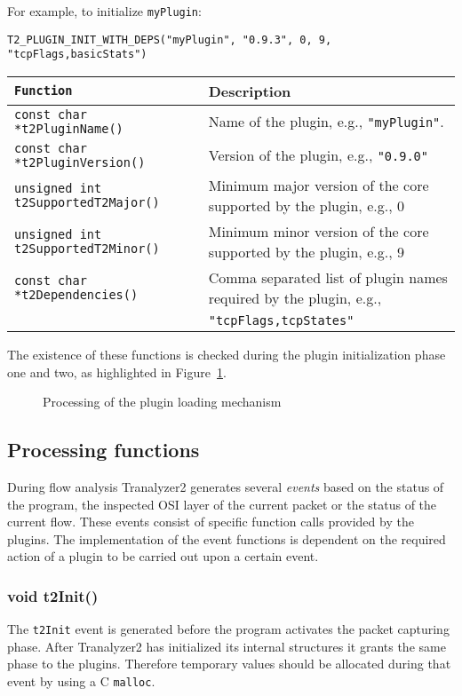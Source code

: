 \documentclass[documentation]{subfiles}
\begin{document}
For example, to initialize {\tt myPlugin}:
\begin{center}
    {\tt T2\_PLUGIN\_INIT\_WITH\_DEPS("myPlugin", "0.9.3", 0, 9, "tcpFlags,basicStats")}
\end{center}

\begin{longtable}{>{\tt}ll}
    \toprule
    {\bf Function} & {\bf Description} \\
    \midrule\endhead%
    const char *t2PluginName()        & Name of the plugin, e.g., {\tt "myPlugin"}.\\
    const char *t2PluginVersion()     & Version of the plugin, e.g., {\tt "0.9.0"}\\
    unsigned int t2SupportedT2Major() & Minimum major version of the core supported by the plugin, e.g., 0\\
    unsigned int t2SupportedT2Minor() & Minimum minor version of the core supported by the plugin, e.g., 9\\
    const char *t2Dependencies()      & Comma separated list of plugin names required by the plugin, e.g.,\\
                                      & {\tt "tcpFlags,tcpStates"}\\
    \bottomrule
\end{longtable}

The existence of these functions is checked during the plugin initialization phase one and two, as highlighted in Figure~\ref{fig:plugin_loading}.

\begin{figure}[!ht]
    \centering
    \caption{Processing of the plugin loading mechanism}
    \label{fig:plugin_loading}
\end{figure}

\subsection{Processing functions}
During flow analysis Tranalyzer2 generates several {\em events} based on the status of the program, the inspected OSI layer of the current packet or the status of the current flow. These events consist of specific function calls provided by the plugins. The implementation of the event functions is dependent on the required action of a plugin to be carried out upon a certain event.

\subsubsection{void t2Init()}
The {\tt t2Init} event is generated before the program activates the packet capturing phase. After Tranalyzer2 has initialized its internal structures it grants the same phase to the plugins. Therefore temporary values should be allocated during that event by using a C {\tt malloc}.
\end{document}
